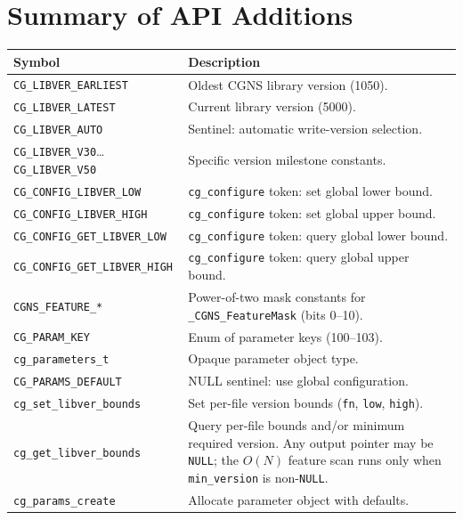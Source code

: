 \documentclass[11pt,letterpaper]{article}
\begin{document}
\section{Summary of API Additions}

\begin{center}
\begin{longtable}{l p{8.5cm}}
\toprule
\textbf{Symbol} & \textbf{Description} \\
\midrule
\endhead
\texttt{CG\_LIBVER\_EARLIEST}   & Oldest CGNS library version (1050). \\
\texttt{CG\_LIBVER\_LATEST}     & Current library version (5000). \\
\texttt{CG\_LIBVER\_AUTO}       & Sentinel: automatic write-version selection. \\
\texttt{CG\_LIBVER\_V30}\ldots\texttt{CG\_LIBVER\_V50} & Specific version milestone constants. \\
\texttt{CG\_CONFIG\_LIBVER\_LOW}       & \texttt{cg\_configure} token: set global lower bound. \\
\texttt{CG\_CONFIG\_LIBVER\_HIGH}      & \texttt{cg\_configure} token: set global upper bound. \\
\texttt{CG\_CONFIG\_GET\_LIBVER\_LOW}  & \texttt{cg\_configure} token: query global lower bound. \\
\texttt{CG\_CONFIG\_GET\_LIBVER\_HIGH} & \texttt{cg\_configure} token: query global upper bound. \\
\texttt{CGNS\_FEATURE\_*}  & Power-of-two mask constants for \texttt{\_CGNS\_FeatureMask} (bits 0--10). \\
\texttt{CG\_PARAM\_KEY}         & Enum of parameter keys (100--103). \\
\texttt{cg\_parameters\_t}      & Opaque parameter object type. \\
\texttt{CG\_PARAMS\_DEFAULT}    & NULL sentinel: use global configuration. \\
\texttt{cg\_set\_libver\_bounds} & Set per-file version bounds (\texttt{fn}, \texttt{low}, \texttt{high}). \\
\texttt{cg\_get\_libver\_bounds} & Query per-file bounds and/or minimum required version.  Any output pointer may be \texttt{NULL}; the $O(N)$ feature scan runs only when \texttt{min\_version} is non-\texttt{NULL}. \\
\texttt{cg\_params\_create}     & Allocate parameter object with defaults. \\

\end{longtable}
\end{center}
\end{document}
